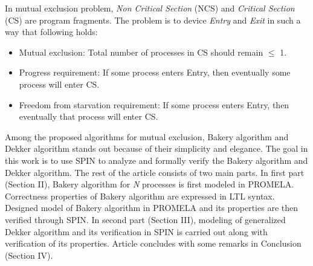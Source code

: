 \documentclass[conference]{IEEEtran}
\begin{document}
In mutual exclusion problem, \textit{Non Critical Section} (NCS) and \textit{Critical Section} (CS) are program fragments. 
The problem is to device \textit{Entry} and \textit{Exit} in such a way that following holds: 
\begin{itemize}
 \item Mutual exclusion: Total number of processes in CS should remain $\leq$ 1.
 \item Progress requirement: If some process enters Entry, then eventually some process will enter CS. 
 \item Freedom from starvation requirement: If some process enters Entry, then eventually that process will enter CS. 
\end{itemize}

Among the proposed algorithms for mutual exclusion, Bakery algorithm \cite{13} and Dekker algorithm \cite{9} stands out because of their simplicity
and elegance. 
The goal in this work is to use SPIN to analyze and formally verify the Bakery algorithm and Dekker algorithm. The rest of the article 
consists of two main parts. In first part (Section II), Bakery algorithm for \emph{N} processes is first modeled in PROMELA. Correctness properties 
of Bakery algorithm are expressed in LTL syntax. Designed model of Bakery algorithm in PROMELA and its properties are then verified through SPIN.
In second part (Section III), modeling of generalized Dekker algorithm and its verification in SPIN is carried out along with verification of 
its properties. Article concludes with some remarks in Conclusion (Section IV).
\end{document}
